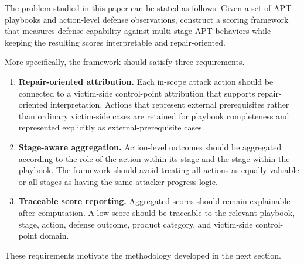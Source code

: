 The problem studied in this paper can be stated as follows. Given a set of APT playbooks and action-level defense observations, construct a scoring framework that measures defense capability against multi-stage APT behaviors while keeping the resulting scores interpretable and repair-oriented.

More specifically, the framework should satisfy three requirements.

\begin{enumerate}
    \item \textbf{Repair-oriented attribution.} Each in-scope attack action should be connected to a victim-side control-point attribution that supports repair-oriented interpretation. Actions that represent external prerequisites rather than ordinary victim-side cases are retained for playbook completeness and represented explicitly as external-prerequisite cases.
    \item \textbf{Stage-aware aggregation.} Action-level outcomes should be aggregated according to the role of the action within its stage and the stage within the playbook. The framework should avoid treating all actions as equally valuable or all stages as having the same attacker-progress logic.

    \item \textbf{Traceable score reporting.} Aggregated scores should remain explainable after computation. A low score should be traceable to the relevant playbook, stage, action, defense outcome, product category, and victim-side control-point domain.
\end{enumerate}

These requirements motivate the methodology developed in the next section.


